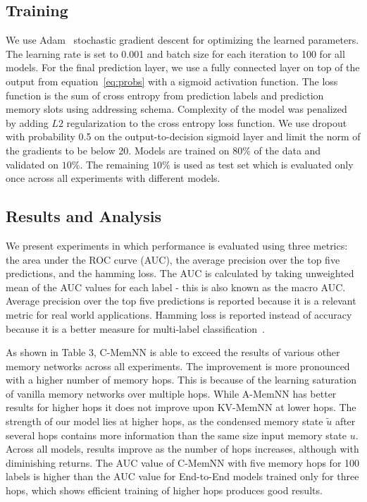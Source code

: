 \subsection{Training}
    We use Adam~\cite{Kingma2014AdamAM} stochastic gradient descent for optimizing the learned parameters. The learning rate is set to 0.001 and batch size for each iteration to 100 for all models. For the final prediction layer, we use a fully connected layer on top of the output from equation~\ref{eq:probs} with a sigmoid activation function. The loss function is the sum of cross entropy from prediction labels and prediction memory slots using addressing schema. Complexity of the model was penalized by adding $L2$ regularization to the cross entropy loss function.  We use dropout~\cite{Srivastava2014DropoutAS} with probability 0.5 on the output-to-decision sigmoid layer and limit the norm of the gradients to be below 20. Models are trained on $80\%$ of the data and validated on $10\%$. The remaining $10\%$ is used as test set which is evaluated only once across all experiments with different models. 



\subsection{Results and Analysis}

We present experiments in which performance is evaluated using three metrics: the area under the ROC curve (AUC), the average precision over the top five predictions, and the hamming loss. The AUC is calculated by taking unweighted mean of the AUC values for each label - this is also known as the macro AUC\@. Average precision over the top five predictions is reported because it is a relevant metric for real world applications. Hamming loss is reported instead of accuracy because it is a better measure for multi-label classification~\cite{elisseeff2001kernel}. 

    As shown in Table 3, C-MemNN is able to exceed the results of various other memory networks across all experiments.  The improvement is more pronounced with a higher number of memory hops. This is because of the learning saturation of vanilla memory networks over multiple hops. While A-MemNN has better results for higher hops it does not improve upon KV-MemNN at lower hops. The strength of our model lies at higher hops, as the condensed memory state $\widetilde{u}$ after several hops contains more information than the same size input memory state $u$. Across all models, results improve as the number of hops increases, although with diminishing returns. The AUC value of C-MemNN with five memory hops for 100 labels is higher than the AUC value for End-to-End models trained only for three hops, which shows efficient training of higher hops produces good results. 
    
